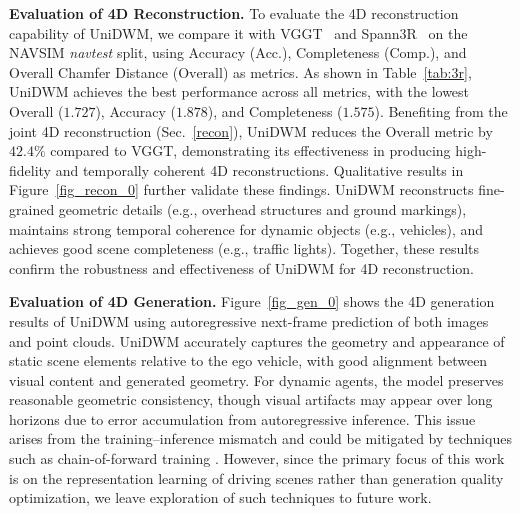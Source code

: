 \begin{table}[t]
\centering
\caption{\textbf{Additional finetune with GRPO.} The model in the first row of Table~\ref{tab:ablation} is used as the baseline.}
\label{tab:grpo}
\end{table}

\noindent\textbf{Evaluation of 4D Reconstruction.}
To evaluate the 4D reconstruction capability of UniDWM, we compare it with VGGT~\cite{vggt} and Spann3R~\cite{wang20253d} on the NAVSIM \textit{navtest} split, using Accuracy ($\text{Acc.}$), Completeness ($\text{Comp.}$), and Overall Chamfer Distance ($\text{Overall}$) as metrics. As shown in Table~\ref{tab:3r}, UniDWM achieves the best performance across all metrics, with the lowest Overall ($1.727$), Accuracy ($1.878$), and Completeness ($1.575$). Benefiting from the joint 4D reconstruction (Sec.~\ref{recon}), UniDWM reduces the Overall metric by $\mathbf{42.4\%}$ compared to VGGT, demonstrating its effectiveness in producing high-fidelity and temporally coherent 4D reconstructions. Qualitative results in Figure~\ref{fig_recon_0} further validate these findings. UniDWM reconstructs fine-grained geometric details (e.g., overhead structures and ground markings), maintains strong temporal coherence for dynamic objects (e.g., vehicles), and achieves good scene completeness (e.g., traffic lights). Together, these results confirm the robustness and effectiveness of UniDWM for 4D reconstruction.

\noindent\textbf{Evaluation of 4D Generation.}
Figure~\ref{fig_gen_0} shows the 4D generation results of UniDWM using autoregressive next-frame prediction of both images and point clouds. UniDWM accurately captures the geometry and appearance of static scene elements relative to the ego vehicle, with good alignment between visual content and generated geometry. For dynamic agents, the model preserves reasonable geometric consistency, though visual artifacts may appear over long horizons due to error accumulation from autoregressive inference. This issue arises from the training–inference mismatch and could be mitigated by techniques such as chain-of-forward training \cite{epona}. However, since the primary focus of this work is on the representation learning of driving scenes rather than generation quality optimization, we leave exploration of such techniques to future work.


